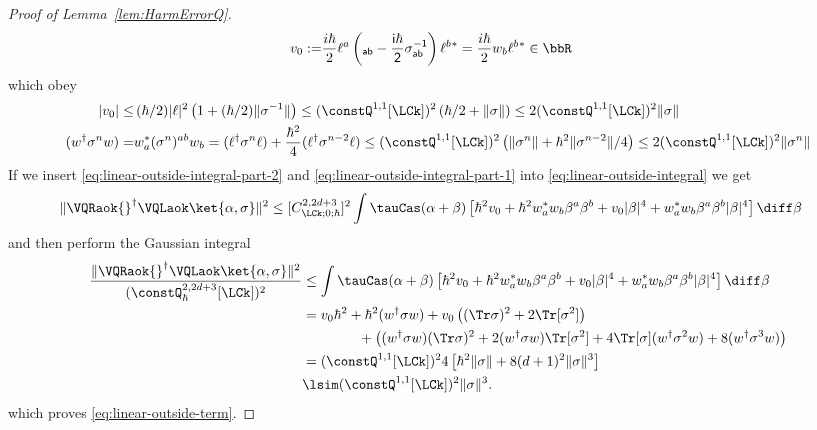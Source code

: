 \documentclass{article}
\numberwithin{equation}{section}
\begin{document}
\begin{proof}[Proof of Lemma~\ref{lem:HarmErrorQ}]
\begin{align}
		v_0 :=& 
		\frac{i\hbar}{2} {\ell^a} \left(\sf_{ab} -\frac{i\hbar}{2}  \sigma^{-1}_{ab}\right) \ell^b{}^* 
		=\frac{i\hbar}{2} w_b \ell^b{}^*\in \bbR 
	\end{align}
	which obey 
	\begin{align}
		|v_0| \le & \, (\hbar/2)|\ell |^2   \left(1 + (\hbar/2)\| \sigma^{-1}\| \right) 
		\le (\constQ^{1,1}[\LCk])^2  \left(\hbar/2  + \|\sigma\|\right) 
		\le 2 (\constQ^{1,1}[\LCk])^2  \|\sigma\|
		\\
		(w^\dagger \sigma^n w) =& w_a^* (\sigma^n)^{ab} w_b = (\ell^\dagger \sigma^n \ell)+\frac{\hbar^2}{4} (\ell^\dagger \sigma^{n-2} \ell) 
		\le (\constQ^{1,1}[\LCk])^2 \left( \|\sigma^n\|+\hbar^2 \|\sigma^{n-2}\|/4 \right) 
		\le 2 (\constQ^{1,1}[\LCk])^2 \|\sigma^n\|
	\end{align}
	If we insert \eqref{eq:linear-outside-integral-part-2} and \eqref{eq:linear-outside-integral-part-1} into \eqref{eq:linear-outside-integral} we get
	\begin{align}\begin{split}
			\|\VQRaok{}^\dagger \VQLaok\ket{\alpha,\sigma}\|^2
			& \leq 
			[C^{2,2d+3}_{\LCk;0;\hbar}]^2
			\int \tauCas(\alpha+\beta)\left[\hbar^2 v_0  + \hbar^2 w_a^* w_b \beta^a \beta^b + v_0 |\beta|^4 + w_a^* w_b \beta^a \beta^b |\beta|^4  \right]\diff \beta
	\end{split}\end{align}
	and then perform the Gaussian integral
	\begin{align}\begin{split}\label{eq:inside-bound}
			\frac{\|\VQRaok{}^\dagger \VQLaok\ket{\alpha,\sigma}\|^2}
			{(\constQ^{2,2d+3}_{\hbar}[\LCk])^2}
			&\leq 
			\int \tauCas(\alpha+\beta)\left[\hbar^2 v_0  + \hbar^2 w_a^* w_b \beta^a \beta^b + v_0 |\beta|^4 + w_a^* w_b \beta^a \beta^b |\beta|^4  \right]\diff \beta\\
			&= 
			v_0 \hbar^2 +  \hbar^2 (w^\dagger \sigma w) + v_0 \left((\Tr\sigma)^2 + 2 \Tr[\sigma^2]\right)  \\
			&\qquad \qquad    +  \left((w^\dagger \sigma w)(\Tr\sigma)^2+ 2 (w^\dagger \sigma w) \Tr[\sigma^2] + 4 \Tr[\sigma] (w^\dagger \sigma^2 w) + 8 (w^\dagger \sigma^3 w)\right) \\
			&= 
			(\constQ^{1,1}[\LCk])^2
			4\left[\hbar^2 \|\sigma\| + 8(d+1)^2\|\sigma\|^3\right]\\
			&\lsim (\constQ^{1,1}[\LCk])^2 
			\|\sigma\|^3.
	\end{split}
 \end{align}
	which proves \eqref{eq:linear-outside-term}.
	

\end{proof}
\end{document}
